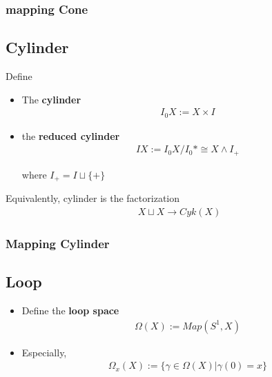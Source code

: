 \documentclass[Total.tex]{subfiles}
\begin{document}
				\subsubsection{mapping Cone}
			\subsection{Cylinder}
				\begin{Def}
					Define 
					\begin{itemize}
						\item The \textbf{cylinder}
						\begin{gather*}
							I_0X:=X\times I
						\end{gather*}
						\item the \textbf{reduced cylinder}
						\begin{gather*}
							IX:=I_0X/I_0*\cong X\wedge I_+
						\end{gather*}
						
						where $I_+=I\sqcup \{+\}$
					\end{itemize}
				\end{Def}
				
				\begin{proposition}
					Equivalently, cylinder is the factorization
					\begin{gather*}
						X\sqcup X\rightarrow Cyk(X)
					\end{gather*}
				\end{proposition}
				\subsubsection{Mapping Cylinder}
			\subsection{Loop}
				\begin{Def}
					\begin{itemize}
						\item 
						Define the \textbf{loop space}
						\begin{gather*}
							\Omega(X):=Map(S^1,X)
						\end{gather*}
						\item Especially, 
						\begin{gather*}
							\Omega_{x}(X):=\{\gamma\in \Omega(X)|\gamma(0)=x\}
						\end{gather*}
					\end{itemize}
				\end{Def}
				
\end{document}
